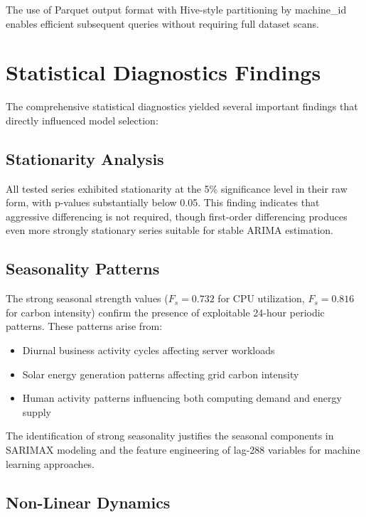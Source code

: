 \documentclass[12pt]{report}
\begin{document}
The use of Parquet output format with Hive-style partitioning by machine\_id enables efficient subsequent queries without requiring full dataset scans.

\section{Statistical Diagnostics Findings}

The comprehensive statistical diagnostics yielded several important findings that directly influenced model selection:

\subsection{Stationarity Analysis}

All tested series exhibited stationarity at the 5\% significance level in their raw form, with p-values substantially below 0.05. This finding indicates that aggressive differencing is not required, though first-order differencing produces even more strongly stationary series suitable for stable ARIMA estimation.

\subsection{Seasonality Patterns}

The strong seasonal strength values ($F_s = 0.732$ for CPU utilization, $F_s = 0.816$ for carbon intensity) confirm the presence of exploitable 24-hour periodic patterns. These patterns arise from:

\begin{itemize}
    \item Diurnal business activity cycles affecting server workloads
    \item Solar energy generation patterns affecting grid carbon intensity
    \item Human activity patterns influencing both computing demand and energy supply
\end{itemize}

The identification of strong seasonality justifies the seasonal components in SARIMAX modeling and the feature engineering of lag-288 variables for machine learning approaches.

\subsection{Non-Linear Dynamics}
\end{document}
